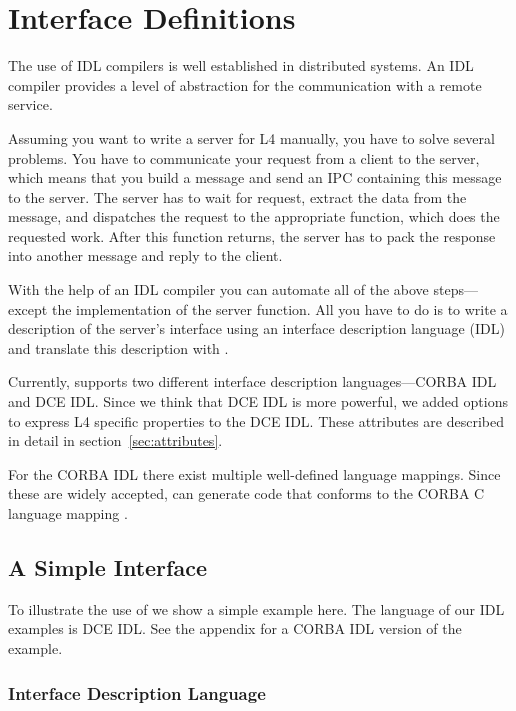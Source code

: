 \chapter{Interface Definitions}
\label{section1}

The use of IDL compilers is well established in distributed systems. An IDL
compiler provides a level of abstraction for the communication with a remote
service.

Assuming you want to write a server for L4 manually, you have to solve several
problems. You have to communicate your request from a client to the server,
which means that you build a message and send an IPC containing this message
to the server. The server has to wait for request, extract the data from the
message, and dispatches the request to the appropriate function, which does
the requested work. After this function returns, the server has to pack the
response into another message and reply to the client.

With the help of an IDL compiler you can automate all of the above
steps---except the implementation of the server function. All you have to do
is to write a description of the server's interface using an interface
description language (IDL) and translate this description with \dice{}.

Currently, \dice{} supports two different interface description
languages---CORBA IDL and DCE IDL. Since we think that DCE IDL is more
powerful, we added options to express L4 specific properties to the DCE IDL.
These attributes are described in detail in section~\ref{sec:attributes}.

For the CORBA IDL there exist multiple well-defined language mappings. Since
these are widely accepted, \dice{} can generate code that conforms to the
CORBA C language mapping \cite{corba-clm}.

\section{A Simple Interface}

To illustrate the use of \dice{} we show a simple example here. The language
of our IDL examples is DCE IDL. See the appendix for a CORBA IDL version of
the example.

\subsection{Interface Description Language}

